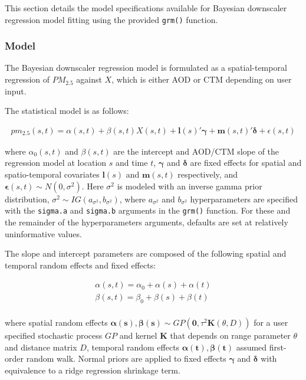 \documentclass[12pt]{article}
\newcommand{\bs}{\boldsymbol}
\newcommand{\bl}{\mathbf}
\begin{document}
This section details the model specifications available for Bayesian downscaler regression model fitting using the provided \texttt{grm()} function. 

\subsubsection*{Model}

The Bayesian downscaler regression model is formulated as a spatial-temporal regression of $PM_{2.5}$ against $X$, which is either AOD or CTM depending on user input. 

The statistical model is as follows:

\begin{align*} 
    pm_{2.5}(s,t) = \alpha(s, t) + \beta(s, t) X(s, t) + \mathbf{l}(s)' \bs{\gamma} +  \mathbf{m}(s, t)' \boldsymbol{\delta} + \epsilon(s, t)
\end{align*}
         
where $\alpha_0(s, t)$ and $\beta(s, t)$ are the intercept and AOD/CTM slope of the regression model at location $s$ and time $t$, $\bs{\gamma}$ and $\bs{\delta}$ are fixed effects for spatial and spatio-temporal covariates $\mathbf{l}(s)$ and $\mathbf{m}(s, t)$ respectively, and $\bs{\epsilon}(s, t) \sim N(0, \sigma^2)$. Here $\sigma^2$ is modeled with an inverse gamma prior distribution, $\sigma^2 \sim IG(a_{\sigma^2}, b_{\sigma^2})$, where $a_{\sigma^2}$ and $b_{\sigma^2}$ hyperparameters are specified with the \texttt{sigma.a} and \texttt{sigma.b} arguments in the \texttt{grm()} function.
For these and the remainder of the hyperparameters arguments, defaults are set at relatively uninformative values.

The slope and intercept parameters are composed of the following spatial and temporal random effects and fixed effects:

\begin{align*}
    \alpha(s, t) = \alpha_0 + \alpha(s) + \alpha(t) \\
    \beta(s, t) = \beta_0 + \beta(s) + \beta(t) \\
\end{align*} 

where spatial random effects $\bs{\alpha}(\bl{s}), \bs{\beta}(\bl{s}) \sim GP(\bl{0}, \tau^2 \bl{K}(\theta, D))$ for a user specified stochastic process $GP$ and kernel $\bl{K}$ that depends on range parameter $\theta$ and distance matrix $D$, temporal random effects $\bs{\alpha}(\bl{t}), \bs{\beta}(\bl{t})$ assumed first-order random walk.
 Normal priors are applied to fixed effects $\bs{\gamma}$ and $\bs{\delta}$ with equivalence to a ridge regression shrinkage term. 
\end{document}
